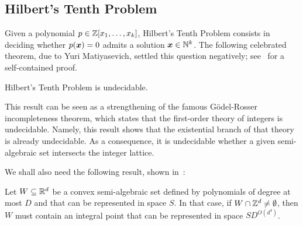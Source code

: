 \subsection{Hilbert's Tenth Problem}
Given a polynomial $p \in \mathbb{Z}[x_{1}, \ldots, x_{k}]$, Hilbert's Tenth Problem consists in deciding whether $p(\boldsymbol{x}) = 0$ admits a solution $\boldsymbol{x} \in \mathbb{N}^{k}$. The following celebrated theorem, due to Yuri Matiyasevich, settled this question negatively; see~\cite{HTP} for a self-contained proof.
\begin{theorem}[Matiyasevich]
\label{thm:HTP}
Hilbert's Tenth Problem is undecidable.
\end{theorem}
This result can be seen as a strengthening of the famous G\"{o}del-Rosser incompleteness theorem, which states that the first-order theory of integers is undecidable. Namely, this result shows that the existential branch of that theory is already undecidable. As a consequence, it is undecidable whether a given semi-algebraic set intersects the integer lattice.

We shall also need the following result, shown in~\cite{KP}:
\begin{theorem}
\label{thm:kp}
Let $W\subseteq\mathbb{R}^{d}$ be a convex semi-algebraic set defined by
polynomials of degree at most $D$ and that can be represented in space
$S$. In that case, if $W\cap\mathbb{Z}^{d}\neq\emptyset$, then $W$ must
contain an integral point that can be represented in space
$SD^{O(d^4)}$.
\end{theorem}
